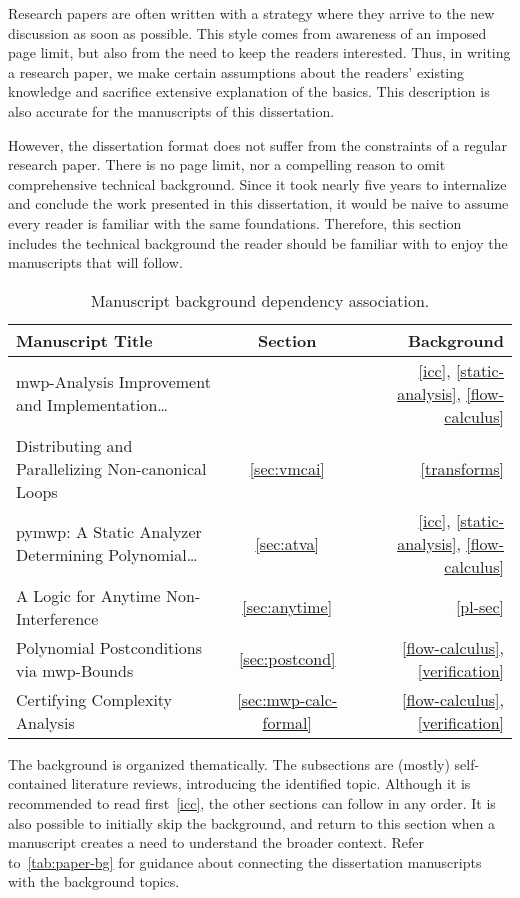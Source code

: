 
Research papers are often written with a strategy where they arrive to the new discussion as soon as possible.
This style comes from awareness of an imposed page limit, but also from the need to keep the readers interested.
Thus, in writing a research paper, we make certain assumptions about the readers' existing knowledge and sacrifice extensive explanation of the basics.
This description is also accurate for the manuscripts of this dissertation.

However, the dissertation format does not suffer from the constraints of a regular research paper.
There is no page limit, nor a compelling reason to omit comprehensive technical background.
Since it took nearly five years to internalize and conclude the work presented in this dissertation, it would be naive to assume every reader is familiar with the same foundations.
Therefore, this section includes the technical background the reader should be familiar with to enjoy the manuscripts that will follow.

\begin{table}[h!]
\begin{NiceTabularX}{\linewidth}{@{}Xcr@{}}
\toprule
\textbf{Manuscript Title} & \textbf{Section} & \textbf{Background} \\
\midrule
{mwp-Analysis Improvement and Implementation\ldots} & 
& \ref{icc}, \ref{static-analysis}, \ref{flow-calculus} \\
{Distributing and Parallelizing Non-canonical Loops} & \ref{sec:vmcai}
& \ref{transforms} \\
{pymwp: A Static Analyzer Determining Polynomial\ldots} & \ref{sec:atva}
& \ref{icc}, \ref{static-analysis}, \ref{flow-calculus} \\
{A Logic for Anytime Non-Interference} & \ref{sec:anytime}
& \ref{pl-sec} \\
{Polynomial Postconditions via mwp-Bounds} & \ref{sec:postcond}
& \ref{flow-calculus}, \ref{verification} \\
{Certifying Complexity Analysis} & \ref{sec:mwp-calc-formal}
& \ref{flow-calculus}, \ref{verification} \\
\bottomrule
\end{NiceTabularX}
\caption[Manuscript background dependency association]{Manuscript background dependency association.}
\label{tab:paper-bg}
\end{table}

The background is organized thematically.
The subsections are (mostly) self-contained literature reviews, introducing the identified topic.
Although it is recommended to read first~\autoref{icc}, the other sections can follow in any order.
It is also possible to initially skip the background, and return to this section when a manuscript creates a need to understand the broader context.
Refer to~\autoref{tab:paper-bg} for guidance about connecting the dissertation manuscripts with the background topics.
